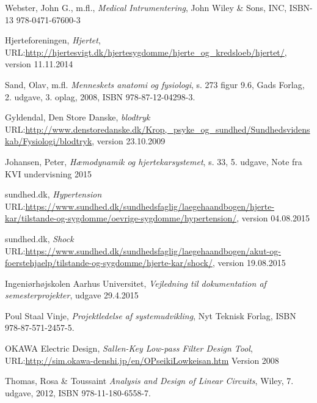 \begin{thebibliography}{9}
	
	Webster, John G., m.fl.,
	\emph{Medical Intrumentering},
	John Wiley \& Sons, INC, ISBN-13 978-0471-67600-3
	 
	 
	Hjerteforeningen,
	\emph{Hjertet},
	URL:\url{http://hjertesvigt.dk/hjertesygdomme/hjerte_og_kredsloeb/hjertet/},
	version 11.11.2014
	
	Sand, Olav, m.fl.
	\emph{Menneskets anatomi og fysiologi},
	s. 273 figur 9.6,
	Gads Forlag,
	2. udgave, 3. oplag,
	2008, ISBN 978-87-12-04298-3. 
	
	Gyldendal, Den Store Danske,
	\emph{blodtryk}
	URL:\url{http://www.denstoredanske.dk/Krop,_psyke_og_sundhed/Sundhedsvidenskab/Fysiologi/blodtryk},
	version 23.10.2009
	
	Johansen, Peter,
	\emph{Hæmodynamik og hjertekarsystemet},
	s. 33,
	5. udgave,
	Note fra KVI undervisning 2015
	
	sundhed.dk,
	\emph{Hypertension}
	URL:\url{https://www.sundhed.dk/sundhedsfaglig/laegehaandbogen/hjerte-kar/tilstande-og-sygdomme/oevrige-sygdomme/hypertension/},
	version 04.08.2015
	
	sundhed.dk,
	\emph{Shock}
	URL:\url{https://www.sundhed.dk/sundhedsfaglig/laegehaandbogen/akut-og-foerstehjaelp/tilstande-og-sygdomme/hjerte-kar/shock/},
	version 19.08.2015
	
	Ingeniørhøjskolen Aarhus Universitet,
	\emph{Vejledning til dokumentation af semesterprojekter},
	udgave 29.4.2015
	
	
	Poul Staal Vinje,
	\emph{Projektledelse af systemudvikling},
	Nyt Teknisk Forlag,
	ISBN 978-87-571-2457-5.
	
	OKAWA Electric Design,
	\emph{Sallen-Key Low-pass Filter Design Tool},
	URL:\url{http://sim.okawa-denshi.jp/en/OPseikiLowkeisan.htm}
	Version 2008
	
	
	Thomas, Rosa & Toussaint
	\emph{Analysis and Design of Linear Circuits},
	Wiley,
	7. udgave, 
	2012, ISBN  978-11-180-6558-7. 
	
	
\end{thebibliography}


